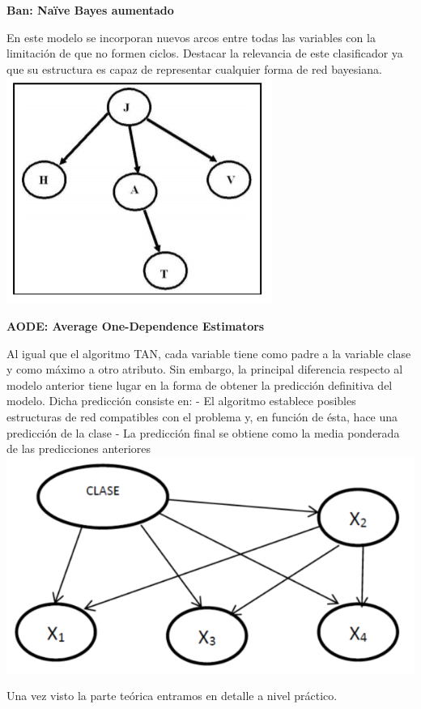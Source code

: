 \documentclass[
  a4paper,
  DIV=11,
  numbers=noendperiod]{scrreprt}
\begin{document}
\textbf{Ban: Naïve Bayes aumentado}

En este modelo se incorporan nuevos arcos entre todas las variables con
la limitación de que no formen ciclos. Destacar la relevancia de este
clasificador ya que su estructura es capaz de representar cualquier
forma de red bayesiana.
\includegraphics{imagenes/capitulo2/topologia_bayesiana.jpg}

\textbf{AODE: Average One-Dependence Estimators}

Al igual que el algoritmo TAN, cada variable tiene como padre a la
variable clase y como máximo a otro atributo. Sin embargo, la principal
diferencia respecto al modelo anterior tiene lugar en la forma de
obtener la predicción definitiva del modelo. Dicha predicción consiste
en: - El algoritmo establece posibles estructuras de red compatibles con
el problema y, en función de ésta, hace una predicción de la clase - La
predicción final se obtiene como la media ponderada de las predicciones
anteriores \includegraphics{imagenes/capitulo2/modelo_aode.png}

Una vez visto la parte teórica entramos en detalle a nivel práctico.
\end{document}
